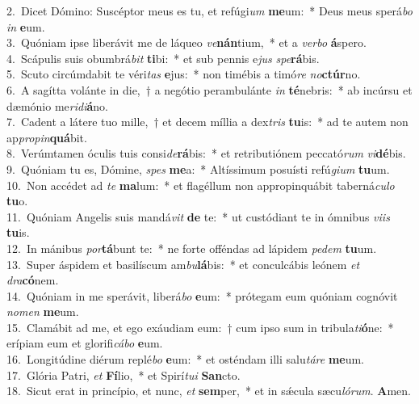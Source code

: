 {2.~}Dicet Dómino: Suscéptor meus es tu, et refúgi\textit{um} \textbf{me}um:~* Deus meus sperá\textit{bo} \textit{in} \textbf{e}um.\\
{3.~}Quóniam ipse liberávit me de láqueo \textit{ve}\textbf{nán}tium,~* et a \textit{ver}\textit{bo} \textbf{á}spero.\\
{4.~}Scápulis suis obumbrá\textit{bit} \textbf{ti}bi:~* et sub pennis e\textit{jus} \textit{spe}\textbf{rá}bis.\\
{5.~}Scuto circúmdabit te véri\textit{tas} \textbf{e}jus:~* non timébis a timó\textit{re} \textit{no}\textbf{ctúr}no.\\
{6.~}A sagítta volánte in die,~† a negótio perambulánte \textit{in} \textbf{té}nebris:~* ab incúrsu et dæmónio me\textit{ri}\textit{di}\textbf{á}no.\\
{7.~}Cadent a látere tuo mille,~† et decem míllia a dex\textit{tris} \textbf{tu}is:~* ad te autem non ap\textit{pro}\textit{pin}\textbf{quá}bit.\\
{8.~}Verúmtamen óculis tuis consi\textit{de}\textbf{rá}bis:~* et retributiónem peccató\textit{rum} \textit{vi}\textbf{dé}bis.\\
{9.~}Quóniam tu es, Dómine, \textit{spes} \textbf{me}a:~* Altíssimum posuísti refú\textit{gi}\textit{um} \textbf{tu}um.\\
{10.~}Non accédet ad \textit{te} \textbf{ma}lum:~* et flagéllum non appropinquábit taberná\textit{cu}\textit{lo} \textbf{tu}o.\\
{11.~}Quóniam Angelis suis mandá\textit{vit} \textbf{de} te:~* ut custódiant te in ómnibus \textit{vi}\textit{is} \textbf{tu}is.\\
{12.~}In mánibus \textit{por}\textbf{tá}bunt te:~* ne forte offéndas ad lápidem \textit{pe}\textit{dem} \textbf{tu}um.\\
{13.~}Super áspidem et basilíscum am\textit{bu}\textbf{lá}bis:~* et conculcábis leónem \textit{et} \textit{dra}\textbf{có}nem.\\
{14.~}Quóniam in me sperávit, liberá\textit{bo} \textbf{e}um:~* prótegam eum quóniam cognóvit \textit{no}\textit{men} \textbf{me}um.\\
{15.~}Clamábit ad me, et ego exáudiam eum:~† cum ipso sum in tribula\textit{ti}\textbf{ó}ne:~* erípiam eum et glorifi\textit{cá}\textit{bo} \textbf{e}um.\\
{16.~}Longitúdine diérum replé\textit{bo} \textbf{e}um:~* et osténdam illi salu\textit{tá}\textit{re} \textbf{me}um.\\
{17.~}Glória Patri, \textit{et} \textbf{Fí}lio,~* et Spirí\textit{tu}\textit{i} \textbf{San}cto.\\
{18.~}Sicut erat in princípio, et nunc, \textit{et} \textbf{sem}per,~* et in sǽcula sæcu\textit{ló}\textit{rum}. \textbf{A}men.\\
